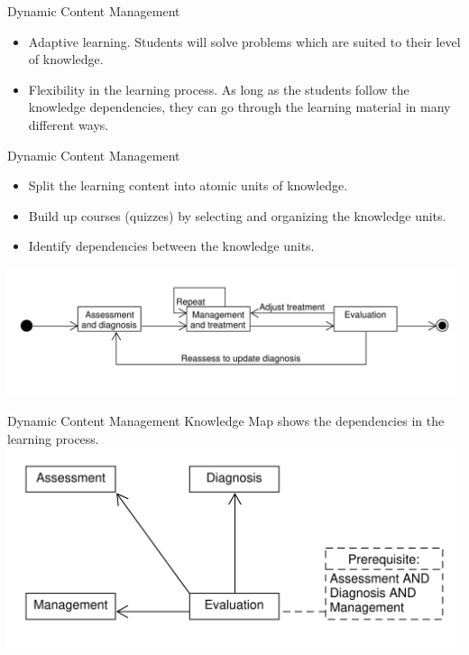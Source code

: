 \documentclass{beamer}
\begin{document}
\begin{frame}{Dynamic Content Management}
\begin{itemize}
	\item Adaptive learning. Students will solve problems which are suited to their level of knowledge.
	\item Flexibility in the learning process. As long as the students follow the knowledge dependencies, they can go through the learning material in many different ways.
\end{itemize}
\end{frame}


\begin{frame}{Dynamic Content Management}
\begin{itemize}
	\item Split the learning content into atomic units of knowledge.
	\item Build up courses (quizzes) by selecting and organizing the knowledge units.
	\item Identify dependencies between the knowledge units.
\end{itemize}
\includegraphics[scale=0.44]{WorkflowGraph}
\end{frame}

\begin{frame}{Dynamic Content Management}
Knowledge Map shows the dependencies in the learning process. 
\includegraphics[scale=0.5]{Knowledge}
\end{frame}
\end{document}

